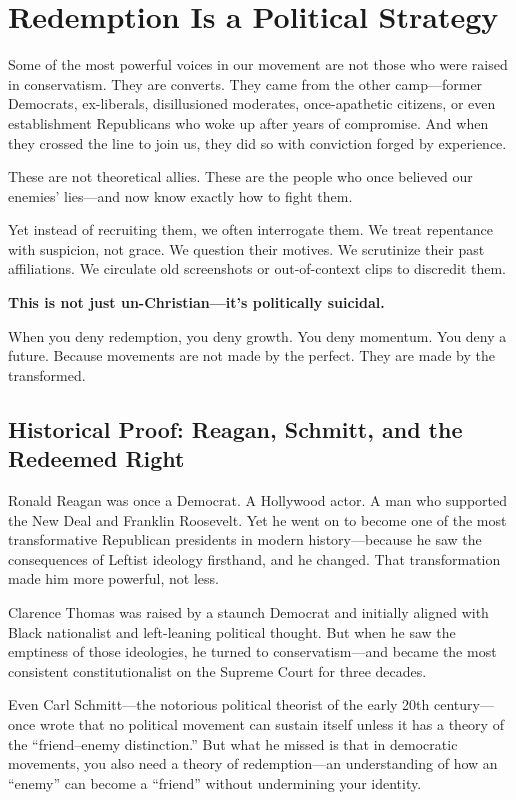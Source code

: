 \section{Redemption Is a Political Strategy}

Some of the most powerful voices in our movement are not those who were raised in conservatism. They are converts. They came from the other camp—former Democrats, ex-liberals, disillusioned moderates, once-apathetic citizens, or even establishment Republicans who woke up after years of compromise. And when they crossed the line to join us, they did so with conviction forged by experience.

These are not theoretical allies. These are the people who once believed our enemies’ lies—and now know exactly how to fight them.

Yet instead of recruiting them, we often interrogate them. We treat repentance with suspicion, not grace. We question their motives. We scrutinize their past affiliations. We circulate old screenshots or out-of-context clips to discredit them.

\textbf{This is not just un-Christian—it’s politically suicidal.}

When you deny redemption, you deny growth. You deny momentum. You deny a future. Because movements are not made by the perfect. They are made by the transformed.

\subsection*{Historical Proof: Reagan, Schmitt, and the Redeemed Right}
Ronald Reagan was once a Democrat. A Hollywood actor. A man who supported the New Deal and Franklin Roosevelt. Yet he went on to become one of the most transformative Republican presidents in modern history—because he saw the consequences of Leftist ideology firsthand, and he changed. That transformation made him more powerful, not less.

Clarence Thomas was raised by a staunch Democrat and initially aligned with Black nationalist and left-leaning political thought. But when he saw the emptiness of those ideologies, he turned to conservatism—and became the most consistent constitutionalist on the Supreme Court for three decades.

Even Carl Schmitt—the notorious political theorist of the early 20th century—once wrote that no political movement can sustain itself unless it has a theory of the “friend–enemy distinction.” But what he missed is that in democratic movements, you also need a theory of redemption—an understanding of how an “enemy” can become a “friend” without undermining your identity.

